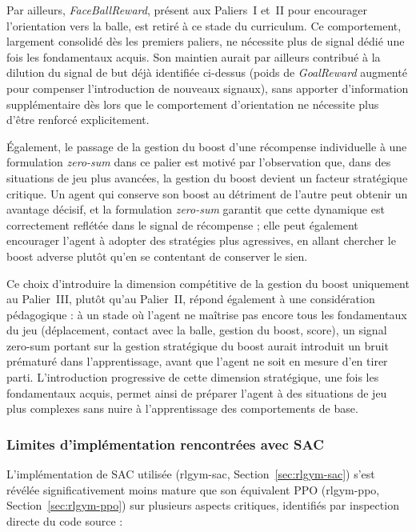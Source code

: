 Par ailleurs, \textit{FaceBallReward}, présent aux Paliers~I et~II pour encourager l'orientation vers la balle, est retiré à ce stade du curriculum. Ce comportement, largement consolidé dès les premiers paliers, ne nécessite plus de signal dédié une fois les fondamentaux acquis. Son maintien aurait par ailleurs contribué à la dilution du signal de but déjà identifiée ci-dessus (poids de \textit{GoalReward} augmenté pour compenser l'introduction de nouveaux signaux), sans apporter d'information supplémentaire dès lors que le comportement d'orientation ne nécessite plus d'être renforcé explicitement.

Également, le passage de la gestion du boost d'une récompense individuelle à une formulation \textit{zero-sum} dans ce palier est motivé par l'observation que, dans des situations de jeu plus avancées, la gestion du boost devient un facteur stratégique critique. Un agent qui conserve son boost au détriment de l'autre peut obtenir un avantage décisif, et la formulation \textit{zero-sum} garantit que cette dynamique est correctement reflétée dans le signal de récompense ; elle peut également encourager l'agent à adopter des stratégies plus agressives, en allant chercher le boost adverse plutôt qu'en se contentant de conserver le sien.

Ce choix d'introduire la dimension compétitive de la gestion du boost uniquement au Palier~III, plutôt qu'au Palier~II, répond également à une considération pédagogique : à un stade où l'agent ne maîtrise pas encore tous les fondamentaux du jeu (déplacement, contact avec la balle, gestion du boost, score), un signal zero-sum portant sur la gestion stratégique du boost aurait introduit un bruit prématuré dans l'apprentissage, avant que l'agent ne soit en mesure d'en tirer parti. L'introduction progressive de cette dimension stratégique, une fois les fondamentaux acquis, permet ainsi de préparer l'agent à des situations de jeu plus complexes sans nuire à l'apprentissage des comportements de base.


\subsubsection{Limites d'implémentation rencontrées avec SAC}
\label{sec:limites-sac}

L'implémentation de SAC utilisée (rlgym-sac, Section~\ref{sec:rlgym-sac}) s'est révélée significativement moins mature que son équivalent PPO (rlgym-ppo, Section~\ref{sec:rlgym-ppo}) sur plusieurs aspects critiques, identifiés par inspection directe du code source :

